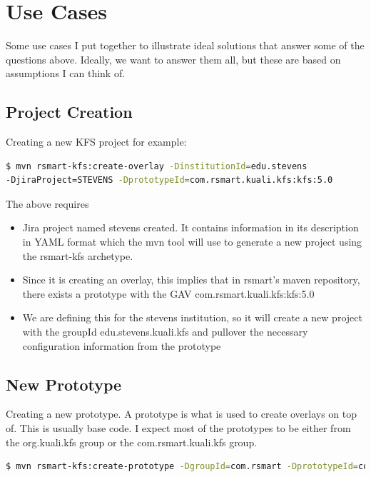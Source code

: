 \documentclass[12pt,notitlepage]{article}
\begin{document}
\section{Use Cases}

Some use cases I put together to illustrate ideal solutions that
answer some of the questions above. Ideally, we want to answer them
all, but these are based on assumptions I can think of.

\subsection{Project Creation}

Creating a new KFS project for example:

\begin{lstlisting}[language=bash,caption={Create a new project with maven}]
$ mvn rsmart-kfs:create-overlay -DinstitutionId=edu.stevens
-DjiraProject=STEVENS -DprototypeId=com.rsmart.kuali.kfs:kfs:5.0
\end{lstlisting}

The above requires
\begin{itemize}
\item Jira project named stevens created. It contains information in
  its description in YAML format which the mvn tool will use to
  generate a new project using the rsmart-kfs archetype.
\item Since it is creating an overlay, this implies that in rsmart's
  maven repository, there exists a prototype with the GAV
  com.rsmart.kuali.kfs:kfs:5.0
\item We are defining this for the stevens institution, so it will
  create a new project with the groupId edu.stevens.kuali.kfs and
  pullover the necessary configuration information from the prototype
\end{itemize}

\subsection{New Prototype}

Creating a new prototype. A prototype is what is used to create
overlays on top of. This is usually base code. I expect most of the
prototypes to be either from the org.kuali.kfs group or the
com.rsmart.kuali.kfs group.

\begin{lstlisting}[language=bash,caption={Deploy a new Prototype}]
$ mvn rsmart-kfs:create-prototype -DgroupId=com.rsmart -DprototypeId=com.rsmart.kuali.kfs:kfs:5.0
\end{lstlisting}
\end{document}
